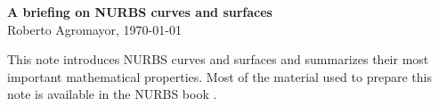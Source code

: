 \documentclass[11pt]{article}
\begin{document}
\thispagestyle{empty}

\begin{center}
{\LARGE \bf A briefing on NURBS curves and surfaces}\\
\vspace{2ex}
{\large Roberto Agromayor, \today }\\
\end{center}

This note introduces NURBS curves and surfaces and summarizes their most important mathematical properties. Most of the material used to prepare this note is available in the NURBS book \parencite[Chapter 4]{NURBS_book}.


\clearpage



 \printbibliography
\end{document}
